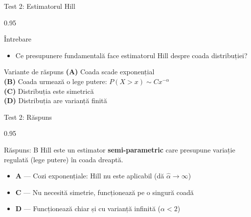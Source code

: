 \documentclass[9pt, aspectratio=169, t]{beamer}
\begin{document}
\begin{frame}{Test 2: Estimatorul Hill}
\begin{cminipage}{0.95\textwidth}
    \begin{alertblock}{Întrebare}
        \begin{itemize}\setlength{\itemsep}{0pt}
            \item Ce presupunere fundamentală face estimatorul Hill despre coada distribuției?
        \end{itemize}
    \end{alertblock}

    \vspace{0.3cm}

    \begin{block}{Variante de răspuns}
        \textcolor{MainBlue}{\textbf{(A)}} Coada scade exponențial\\[3pt]
        \textcolor{MainBlue}{\textbf{(B)}} Coada urmează o lege putere: $P(X > x) \sim Cx^{-\alpha}$\\[3pt]
        \textcolor{MainBlue}{\textbf{(C)}} Distribuția este simetrică\\[3pt]
        \textcolor{MainBlue}{\textbf{(D)}} Distribuția are varianță finită
    \end{block}
\end{cminipage}
\end{frame}

\begin{frame}{Test 2: Răspuns}
\begin{cminipage}{0.95\textwidth}
    \begin{exampleblock}{Răspuns: B}
        Hill este un estimator \textbf{semi-parametric} care presupune variație regulată (lege putere) în coada dreaptă.
    \end{exampleblock}

    \vspace{0.2cm}

    \begin{itemize}\setlength{\itemsep}{0pt}
        \item \textbf{A} --- Cozi exponențiale: Hill nu este aplicabil (dă $\hat{\alpha} \to \infty$) \incorrect
        \item \textbf{C} --- Nu necesită simetrie, funcționează pe o singură coadă \incorrect
        \item \textbf{D} --- Funcționează chiar și cu varianță infinită ($\alpha < 2$) \incorrect
    \end{itemize}
\end{cminipage}
\end{frame}
\end{document}
